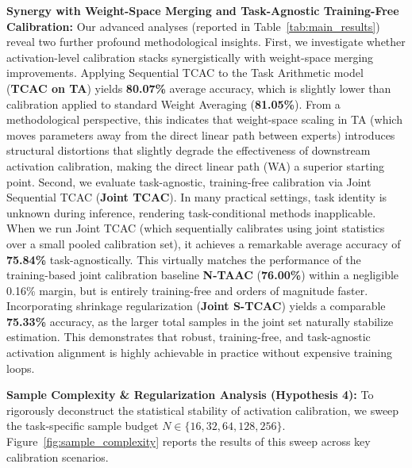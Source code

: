 \documentclass{article}
\theoremstyle{plain}
\theoremstyle{definition}
\theoremstyle{remark}
\begin{document}
\textbf{Synergy with Weight-Space Merging and Task-Agnostic Training-Free Calibration:}
Our advanced analyses (reported in Table~\ref{tab:main_results}) reveal two further profound methodological insights.
First, we investigate whether activation-level calibration stacks synergistically with weight-space merging improvements. Applying Sequential TCAC to the Task Arithmetic model (\textbf{TCAC on TA}) yields \textbf{80.07\%} average accuracy, which is slightly lower than calibration applied to standard Weight Averaging (\textbf{81.05\%}). From a methodological perspective, this indicates that weight-space scaling in TA (which moves parameters away from the direct linear path between experts) introduces structural distortions that slightly degrade the effectiveness of downstream activation calibration, making the direct linear path (WA) a superior starting point.
Second, we evaluate task-agnostic, training-free calibration via Joint Sequential TCAC (\textbf{Joint TCAC}). In many practical settings, task identity is unknown during inference, rendering task-conditional methods inapplicable. When we run Joint TCAC (which sequentially calibrates using joint statistics over a small pooled calibration set), it achieves a remarkable average accuracy of \textbf{75.84\%} task-agnostically. This virtually matches the performance of the training-based joint calibration baseline \textbf{N-TAAC} (\textbf{76.00\%}) within a negligible 0.16\% margin, but is entirely training-free and orders of magnitude faster. Incorporating shrinkage regularization (\textbf{Joint S-TCAC}) yields a comparable \textbf{75.33\%} accuracy, as the larger total samples in the joint set naturally stabilize estimation. This demonstrates that robust, training-free, and task-agnostic activation alignment is highly achievable in practice without expensive training loops.

\textbf{Sample Complexity \& Regularization Analysis (Hypothesis 4):}
To rigorously deconstruct the statistical stability of activation calibration, we sweep the task-specific sample budget $N \in \{16, 32, 64, 128, 256\}$. Figure~\ref{fig:sample_complexity} reports the results of this sweep across key calibration scenarios. 
\end{document}
